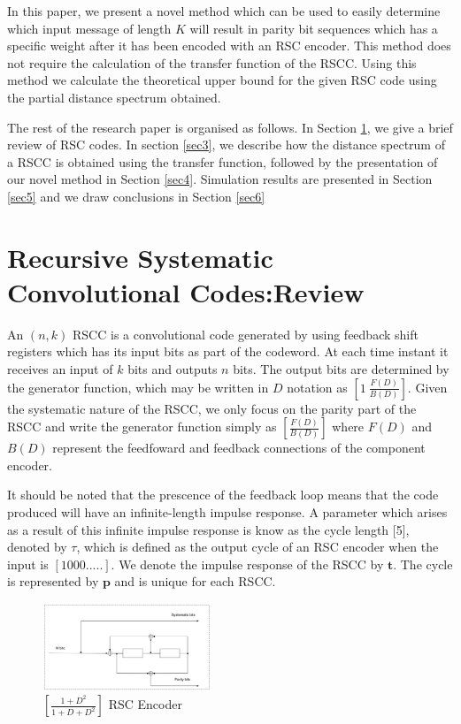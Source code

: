 \documentclass[fontsize=12pt]{article}
\begin{document}
In this paper, we present a novel method which can be used to easily determine which input message of length $K$ will result in parity bit sequences which has a specific weight after it has been encoded with an RSC encoder. This method does not require the calculation of the transfer function of the RSCC. Using this method we calculate the theoretical upper bound for the given RSC code using the partial distance spectrum obtained. 

The rest of the research paper is organised as follows. In Section \ref{sec2}, we give a brief review of RSC codes. In section \ref{sec3}, we describe how the distance spectrum of a RSCC is obtained using the transfer function, followed by the presentation of our novel method in Section \ref{sec4}. Simulation results are presented in Section \ref{sec5} and we draw conclusions in Section \ref{sec6}


\section{Recursive Systematic Convolutional Codes:Review}
\label{sec2}

An $(n,k)$ RSCC is a convolutional code generated by using feedback shift registers which has its input bits as part of the codeword. At each time instant it receives an input of $k$ bits and outputs $n$ bits. The output bits are determined by the generator function, which may be written in $D$ notation as  $[1 ~\frac{F(D)}{B(D)}]$. Given the systematic nature of the RSCC, we only focus on the parity part of the RSCC and write the generator function simply as $[\frac{F(D)}{B(D)}]$ where $F(D)$ and $B(D)$ represent the feedfoward and feedback connections of the component encoder.  

It should be noted that the prescence of the feedback loop means that the code produced will have an infinite-length impulse response. A parameter which arises as a result of this infinite impulse response is know as the cycle length  [5], denoted by $\tau$, which is defined as the output cycle of an RSC encoder when the input is $[1 0 0 0 .....]$. We denote the impulse response of the RSCC by $\textbf{t}$.
 The cycle is represented by $\textbf{p}$ and is unique for each RSCC. 

\begin{figure}[h]
\centering
		\includegraphics[width=0.45\textwidth]{RSCExample3.pdf}
		\caption{$[\frac{1+D^2}{1+D+D^2}]$  RSC Encoder}
		\label{fig1}
		\end{figure}
		
\end{document}
